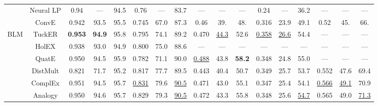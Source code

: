 \documentclass[conference]{IEEEtran}
\begin{document}
\begin{table*}[ht]
\begin{tabular}{c|c|ccc|ccc|ccc|ccc|ccc}
		& Neural LP \cite{yang2017differentiable} &       0.94         &   ---   &       94.5       &       0.76        &  ---  &       83.7       &         ---         &      ---      &        ---         &       0.24         &   ---  &       36.2       &         ---        &      ---       &        ---         \\
		& ConvE \cite{dettmers2017convolutional}  &       0.942         &  93.5   &      {95.5}      &      0.745          &      67.0   &       87.3       &       0.46        &  39.    &       {48.}       &      {0.316}       & 23.9    &       49.1       &       0.52        &       45.     &      {66.}      \\ \hline\hline
		BLM  &   TuckER \cite{balavzevic2019tucker}    &  \textbf{0.953}     & \textbf{94.9}    &       95.8       &      0.795       &   74.1   &       89.2       &       0.470        &  \underline{44.3}     &       52.6       & \underline{0.358}    &   \underline{26.6}   &       54.4       &         ---           &    ---      &        ---         \\
		&      HolEX \cite{xue2018expanding}      &       0.938      &    93.0   &       94.9       &      0.800        &    75.0   &       88.6       &         ---         &     ---       &        ---         &         ---         &     ---       &        ---         &         ---          &    ---       &        ---         \\
		&	QuatE  \cite{zhang2019quaternion}        &   0.950    &  94.5  & 95.9   & 0.782  &  71.1  &  90.0  &  \underline{0.488}  &  43.8  &  \textbf{58.2} &   0.348  &  24.8 &  55.0  &  ---  &  ---  &   ---  \\ 
		&                DistMult                 &       0.821      &      71.7       &       95.2       &      0.817      &        77.7     &       89.5       &       0.443         &  40.4   &       50.7       &      {0.349}       &  25.7  &       53.7       &       0.552          &   47.6    &       69.4       \\
		&                 ComplEx                 &       0.951          &     94.5      &       95.7       &      \underline{0.831}       &    79.6   &  \underline{90.5}   &      {0.471}        &   43.0 	 &       55.1       &       0.347         &     25.4		 &       54.1       & \underline{0.566}      &    \underline{49.1}   &       70.9       \\
		&                 Analogy                 &       0.950         &    94.6   &       95.7       &      0.829      &   79.3   &  \underline{90.5}   & {0.472}    &    43.3   & {55.8} &       0.348       &  25.6    & \underline{54.7} &       0.565         &   49.0    & \underline{71.3} \\

\end{tabular}
\end{table*}
\end{document}
